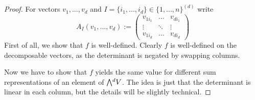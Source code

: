 \documentclass{scrartcl}
\newcommand{\extpow}{\mathchoice{{\textstyle\bigwedge}}
    {{\bigwedge}}
    {{\textstyle\wedge}}
    {{\scriptstyle\wedge}}}
\theoremstyle{definition}
\begin{document}
\begin{proof}
    For vectors $v_1, ..., v_d$ and $I = \{i_1, ..., i_d\} \in \{1, ..., n\}^{(d)}$ write
    \begin{equation*}
        A_I(v_1, ..., v_d) := \left(\begin{matrix*}
            v_{1i_1} & ... & v_{di_1} \\
            \vdots & \ddots & \vdots \\
            v_{1i_d} & ... & v_{di_d}
        \end{matrix*}\right)
    \end{equation*}
    First of all, we show that $f$ is well-defined.
    Clearly $f$ is well-defined on the decomposable vectors, as the determinant is negated by swapping columns.

    Now we have to show that $f$ yields the same value for different sum representations of an element of $\extpow^d V$.
    The idea is just that the determinant is linear in each column, but the details will be slightly technical.


\end{proof}
\end{document}
